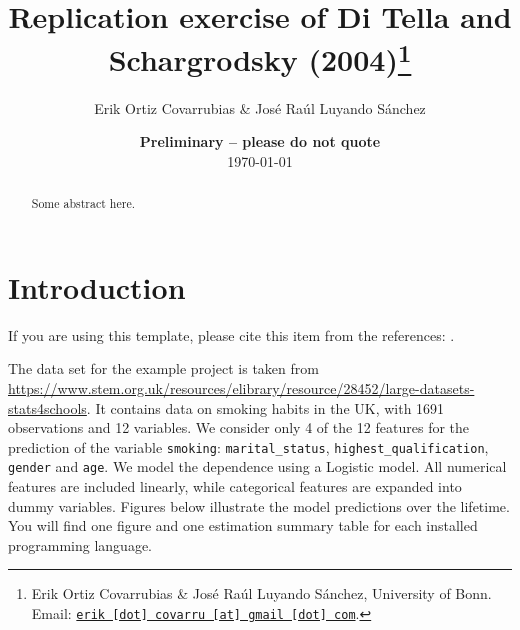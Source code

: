 \documentclass[11pt, a4paper, leqno]{article}
\begin{document}
\title{Replication exercise of Di Tella and Schargrodsky (2004)\thanks{Erik Ortiz Covarrubias \& José Raúl Luyando Sánchez, University of Bonn. Email: \href{mailto:erik.covarru@gmail.com}{\nolinkurl{erik [dot] covarru [at] gmail [dot] com}}.}}

\author{Erik Ortiz Covarrubias \& José Raúl Luyando Sánchez}

\date{
    {\bf Preliminary -- please do not quote}
    \\[1ex]
    \today
}

\maketitle


\begin{abstract}
    Some abstract here.
\end{abstract}

\clearpage


\section{Introduction} %
\label{sec:introduction}

If you are using this template, please cite this item from the references:
\citet{GaudeckerEconProjectTemplates}.

The data set for the example project is taken from
\url{https://www.stem.org.uk/resources/elibrary/resource/28452/large-datasets-stats4schools}.
It contains data on smoking habits in the UK, with 1691 observations and 12 variables.
We consider only 4 of the 12 features for the prediction of the variable
\texttt{smoking}: \texttt{marital\_status}, \texttt{highest\_qualification},
\texttt{gender} and \texttt{age}. We model the dependence using a Logistic model. All
numerical features are included linearly, while categorical features are expanded into
dummy variables. Figures below illustrate the model predictions over the lifetime. You
will find one figure and one estimation summary table for each installed programming
language.















\end{document}
